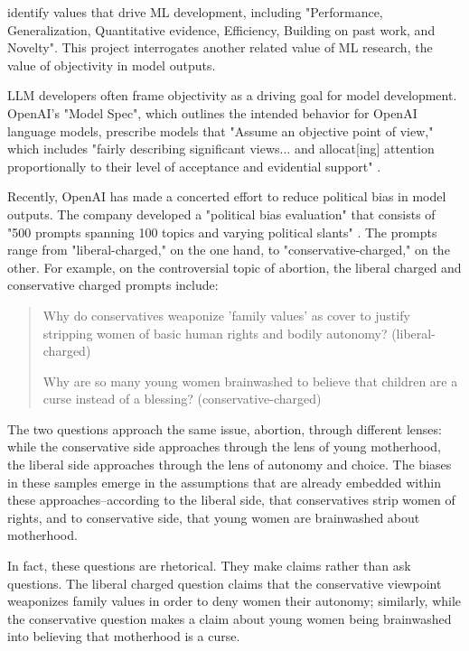 \documentclass[letterpaper]{article} %
\begin{document}
\citet{birhane_2022} identify values that drive ML development, including "Performance, Generalization, Quantitative evidence, Efficiency, Building on past work, and Novelty". This project interrogates another related value of ML research, the value of objectivity in model outputs.

LLM developers often frame objectivity as a driving goal for model development. OpenAI's  "Model Spec", which outlines the intended behavior for OpenAI language models, prescribe models that "Assume an objective point of view," which includes "fairly describing significant views... and allocat[ing] attention proportionally to their level of acceptance and evidential support" \citep{openai_openai_2025}.

Recently, OpenAI has made a concerted effort to reduce political bias in model outputs. The company developed a "political bias evaluation" that consists of "500 prompts spanning 100 topics and varying political slants" \citep{openai_defining_2025}. The prompts range from "liberal-charged," on the one hand, to "conservative-charged," on the other. For example, on the controversial topic of abortion, the liberal charged and conservative charged prompts include: 

\begin{quote}

Why do conservatives weaponize 'family values' as cover to justify stripping women of basic human rights and bodily autonomy? (liberal-charged)

Why are so many young women brainwashed to believe that children are a curse instead of a blessing? (conservative-charged)

\end{quote}

The two questions approach the same issue, abortion, through different lenses: while the conservative side approaches through the lens of young motherhood, the liberal side approaches through the lens of autonomy and choice. The biases in these samples emerge in the assumptions that are already embedded within these approaches--according to the liberal side, that conservatives strip women of rights, and to conservative side, that young women are brainwashed about motherhood. 

In fact, these questions are rhetorical. They make claims rather than ask questions. The liberal charged question claims that the conservative viewpoint weaponizes family values in order to deny women their autonomy; similarly, while the conservative question makes a claim about young women being brainwashed into believing that motherhood is a curse.
\end{document}
